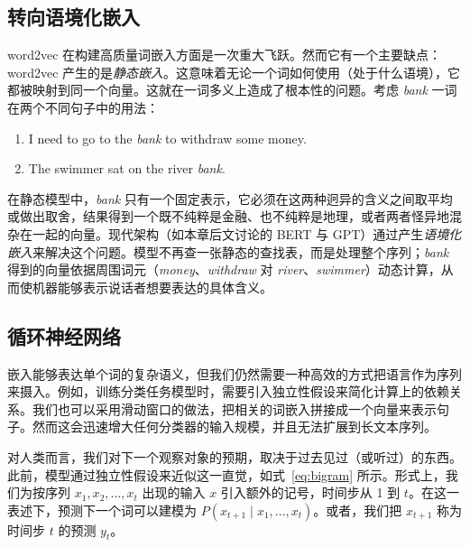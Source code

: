 \subsection{转向语境化嵌入}
word2vec 在构建高质量词嵌入方面是一次重大飞跃。然而它有一个主要缺点：word2vec 产生的是\textit{静态嵌入}。这意味着无论一个词如何使用（处于什么语境），它都被映射到同一个向量。这就在一词多义上造成了根本性的问题。考虑 \textit{bank} 一词在两个不同句子中的用法：
\begin{enumerate}
    \item I need to go to the \textit{bank} to withdraw some money.
    \item The swimmer sat on the river \textit{bank}.
\end{enumerate}
在静态模型中，\textit{bank} 只有一个固定表示，它必须在这两种迥异的含义之间取平均或做出取舍，结果得到一个既不纯粹是金融、也不纯粹是地理，或者两者怪异地混杂在一起的向量。现代架构（如本章后文讨论的 BERT 与 GPT）通过产生\textit{语境化嵌入}来解决这个问题。模型不再查一张静态的查找表，而是处理整个序列；\textit{bank} 得到的向量依据周围词元（\textit{money}、\textit{withdraw} 对 \textit{river}、\textit{swimmer}）动态计算，从而使机器能够表示说话者想要表达的具体含义。


\subsection{循环神经网络}
嵌入能够表达单个词的复杂语义，但我们仍然需要一种高效的方式把语言作为序列来摄入。例如，训练分类任务模型时，需要引入独立性假设来简化计算上的依赖关系。我们也可以采用滑动窗口的做法，把相关的词嵌入拼接成一个向量来表示句子。然而这会迅速增大任何分类器的输入规模，并且无法扩展到长文本序列。

对人类而言，我们对下一个观察对象的预期，取决于过去见过（或听过）的东西。此前，模型通过独立性假设来近似这一直觉，如式~\ref{eq:bigram} 所示。形式上，我们为按序列 $x_1, x_2, \dots, x_t$ 出现的输入 $x$ 引入额外的记号，时间步从 1 到 $t$。在这一表述下，预测下一个词可以建模为 $P(x_{t+1} \mid x_1, \dots, x_t)$。或者，我们把 $x_{t+1}$ 称为时间步 $t$ 的预测 $y_{t}$。 

